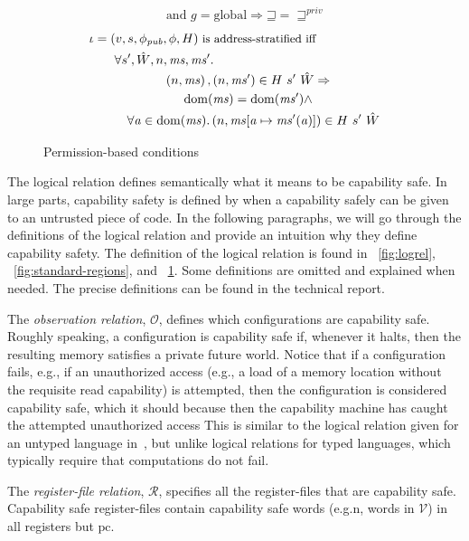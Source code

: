 \documentclass[compsoc,conference,letterpaper,fleqn]{IEEEtran}
\newcommand{\update}[2]{[#1 \mapsto #2]}
\DeclareMathOperator{\dom}{dom}
\newcommand{\var}[1]{\mathit{#1}}
\newcommand{\hs}{\var{ms}}
\newcommand{\ms}{\hs}
\newcommand{\gl}{\var{g}}
\newcommand{\pcreg}{\mathrm{pc}}
\newcommand{\addr}{\var{a}}
\newcommand{\future}{\mathbin{\sqsupseteq}}
\newcommand{\pub}{\var{pub}}
\newcommand{\futurestr}{\mathbin{\sqsupseteq}^{\var{priv}}}
\newcommand{\asmType}{\plaindom{AsmType}}
\newcommand{\plaindom}[1]{\mathrm{#1}}
\newcommand{\intr}[2]{\mathcal{#1}}
\newcommand{\valueintr}[1]{\intr{V}{#1}}
\newcommand{\regintr}[1]{\intr{R}{#1}}
\newcommand{\stdvr}{\valueintr{\asmType}}
\newcommand{\stdrr}{\regintr{\asmType}}
\newcommand{\observations}{\mathcal{O}}
\newcommand{\npair}[2][n]{\left(#1,#2 \right)}
\newcommand{\plainperm}[1]{\mathrm{#1}}
\newcommand{\glob}{\plainperm{global}}
\begin{document}
{\begin{figure}[htbp]
\begin{align*}
  & \quad \text{and } \gl = \glob \Rightarrow \future = \futurestr
\end{align*}
  \begin{align*}
    &\iota = (v,s,\phi_\pub,\phi,H) \text{\footnotesize{ is address-stratified iff}}\\
    &\qquad\begin{multlined}
      \forall s', \hat{W}, n, \ms, \ms' \ldotp \\
      \npair{\ms},\npair{\ms'} \in H~ s'~ \hat{W} \Rightarrow \\
      \dom(\ms) = \dom(\ms') \wedge \\
      \forall \addr \in
      \dom(\ms)\ldotp \npair{\ms\update{\addr}{\ms'(\addr)}} \in H~ s'~ \hat{W}
    \end{multlined}
  \end{align*}

\caption{Permission-based conditions}
\label{fig:perm-conds}
\end{figure}
\clearpage
}
The logical relation defines semantically what it means to be
capability safe. In large parts, capability safety is defined by
when a capability safely can be given to an untrusted piece of
code. In the following paragraphs, we will go through the definitions
of the logical relation and provide an intuition why they define
capability safety.
The definition of the logical relation is found in
\figurename~\ref{fig:logrel}, \figurename~\ref{fig:standard-regions},
and \figurename~\ref{fig:perm-conds}. Some definitions are omitted and
explained when needed. The precise definitions can be found in the
technical report.

The \emph{observation relation}, $\observations$, defines which
configurations are capability safe. Roughly speaking,
a configuration is capability safe if, whenever it halts, then
the resulting memory satisfies a private future world. 
Notice that if a configuration fails, e.g., if an unauthorized access 
(e.g., a load of a memory location without the requisite read capability)
is attempted, then the configuration is considered capability safe, which it should
because then the capability machine has caught the attempted unauthorized access
This is similar to the logical relation given for an untyped language
in~\cite{Devriese:2016ObjCap}, but unlike logical relations for typed languages, which
typically require that computations do not fail. 

The \emph{register-file relation}, $\stdrr$, specifies all the
register-files that are capability safe. Capability safe
register-files contain capability safe words (e.g.n, words in
$\stdvr$) in all registers but $\pcreg$.
\end{document}
